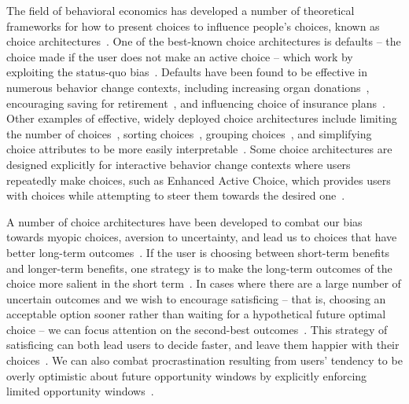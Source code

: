 The field of behavioral economics has developed a number of theoretical frameworks for how to present choices to influence people's choices, known as choice architectures~\cite{thaler1980toward, thaler2009nudge, johnson2012beyond}. One of the best-known choice architectures is defaults -- the choice made if the user does not make an active choice -- which work by exploiting the status-quo bias~\cite{samuelson1988status}. Defaults have been found to be effective in numerous behavior change contexts, including increasing organ donations~\cite{johnson2003defaults}, encouraging saving for retirement~\cite{cronqvist2004design, madrian2001power}, and influencing choice of insurance plans~\cite{johnson1993framing}. Other examples of effective, widely deployed choice architectures include limiting the number of choices~\cite{cronqvist2004design, kling2008misperception}, sorting choices~\cite{lynch2000wine}, grouping choices~\cite{fox2005subjective}, and simplifying choice attributes to be more easily interpretable~\cite{peters2009bringing, soll2013consumer}. Some choice architectures are designed explicitly for interactive behavior change contexts where users repeatedly make choices, such as Enhanced Active Choice, which provides users with choices while attempting to steer them towards the desired one~\cite{keller2011enhanced}.


A number of choice architectures have been developed to combat our bias towards myopic choices, aversion to uncertainty, and lead us to choices that have better long-term outcomes~\cite{johnson2012beyond}. If the user is choosing between short-term benefits and longer-term benefits, one strategy is to make the long-term outcomes of the choice more salient in the short term~\cite{weber2007asymmetric, soman2005psychology}. In cases where there are a large number of uncertain outcomes and we wish to encourage satisficing -- that is, choosing an acceptable option sooner rather than waiting for a hypothetical future optimal choice -- we can focus attention on the second-best outcomes~\cite{shu2008future}. This strategy of satisficing can both lead users to decide faster, and leave them happier with their choices~\cite{iyengar2006doing}. We can also combat procrastination resulting from users' tendency to be overly optimistic about future opportunity windows by explicitly enforcing limited opportunity windows~\cite{o1998procrastination}.




